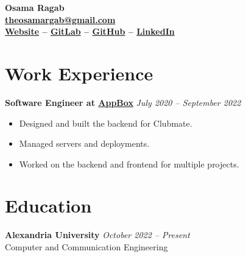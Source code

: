 \documentclass[a4paper]{article}
\newcommand{\hr}{\vspace{10pt}\noindent\hrulefill}
\newcommand{\headerdate}[2]{\textbf{#1} \hfill \textit{\footnotesize{#2}}}
\begin{document}
\begin{center}
	\bfseries{\huge{Osama Ragab}}\\
	\vspace{2mm}
	\href{mailto:theosamargab@gmail.com}{\textbf{theosamargab@gmail.com}}\\
	\vspace{2mm}
	\href{https://osamaragab.gitlab.io}{\textbf{Website}} --
	\href{https://gitlab.com/osamaragab}{\textbf{GitLab}} --
	\href{https://github.com/osamamragab}{\textbf{GitHub}} --
	\href{https://www.linkedin.com/in/osamamragab}{\textbf{LinkedIn}}
\end{center}

\hr

\section{Work Experience}

\headerdate
	{Software Engineer at \href{https://www.app-box.co.uk}{AppBox}}
	{July 2020 -- September 2022}
\begin{itemize}
	\item Designed and built the backend for Clubmate.
	\item Managed servers and deployments.
	\item Worked on the backend and frontend for multiple projects.
\end{itemize}

\hr

\section{Education}

\headerdate{Alexandria University}{October 2022 -- Present}\\
\indent Computer and Communication Engineering
\end{document}
